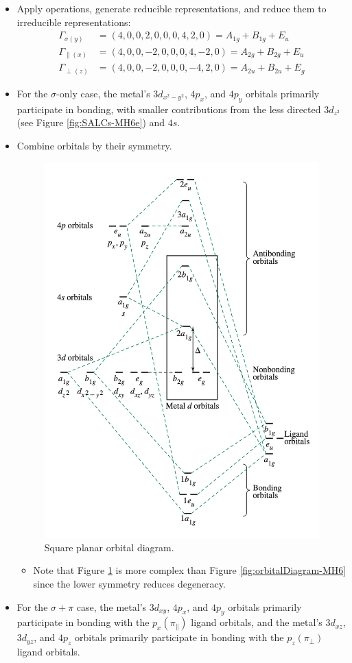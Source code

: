 \documentclass[../notes.tex]{subfiles}
\begin{document}
\begin{itemize}
\begin{itemize}
        \item Apply operations, generate reducible representations, and reduce them to irreducible representations:
        \begin{align*}
            \Gamma_{\sigma(y)} &= (4,0,0,2,0,0,0,4,2,0) = A_{1g}+B_{1g}+E_u\\
            \Gamma_{\parallel(x)} &= (4,0,0,-2,0,0,0,4,-2,0) = A_{2g}+B_{2g}+E_u\\
            \Gamma_{\perp(z)} &= (4,0,0,-2,0,0,0,-4,2,0) = A_{2u}+B_{2u}+E_g
        \end{align*}
        \item For the $\sigma$-only case, the metal's $3d_{x^2-y^2}$, $4p_x$, and $4p_y$ orbitals primarily participate in bonding, with smaller contributions from the less directed $3d_{z^2}$ (see Figure \ref{fig:SALCs-MH6e}) and $4s$.
        \item Combine orbitals by their symmetry.
        \begin{figure}[H]
            \centering
            \includegraphics[width=0.47\linewidth]{../ExtFiles/orbitalDiagram-MH4-squarePlanar.png}
            \caption{Square planar  orbital diagram.}
            \label{fig:orbitalDiagram-MH4-squarePlanar}
        \end{figure}
        \begin{itemize}
            \item Note that Figure \ref{fig:orbitalDiagram-MH4-squarePlanar} is more complex than Figure \ref{fig:orbitalDiagram-MH6} since the lower symmetry reduces degeneracy.
        \end{itemize}
        \item For the $\sigma+\pi$ case, the metal's $3d_{xy}$, $4p_x$, and $4p_y$ orbitals primarily participate in bonding with the $p_x(\pi_\parallel)$ ligand orbitals, and the metal's $3d_{xz}$, $3d_{yz}$, and $4p_z$ orbitals primarily participate in bonding with the $p_z(\pi_\perp)$ ligand orbitals.

\end{itemize}
\end{itemize}
\end{document}
